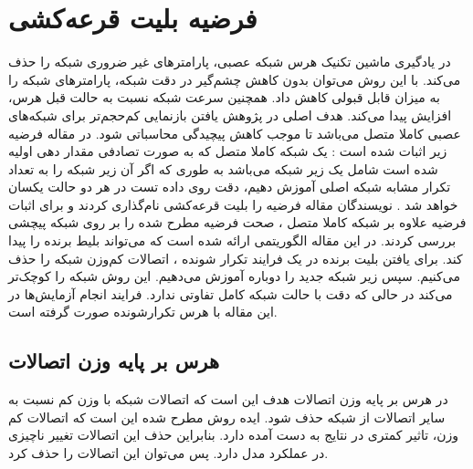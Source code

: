 \section{فرضیه بلیت قرعه‌کشی 
} 
در یادگیری ماشین تکنیک هرس 
شبکه عصبی، پارامتر‌های غیر ضروری شبکه را حذف می‌کند. با این روش می‌توان بدون کاهش چشم‌گیر در دقت شبکه، پارامتر‌های شبکه را به میزان قابل قبولی کاهش داد.  همچنین سرعت شبکه نسبت به حالت قبل هرس، افزایش پیدا می‌کند.
هدف اصلی در پژوهش یافتن بازنمایی کم‌حجم‌تر برای شبکه‌های عصبی کاملا متصل
می‌باشد تا موجب کاهش پیچیدگی محاسباتی شود. در مقاله فرضیه زیر اثبات شده است :
یک شبکه کاملا متصل که به صورت تصادفی مقدار دهی اولیه شده است
شامل یک زیر شبکه
می‌باشد به طوری که اگر آن زیر شبکه را به تعداد تکرار
مشابه شبکه اصلی آموزش دهیم، دقت روی داده تست در هر دو حالت یکسان خواهد شد \cite{frankle2019lottery}.
\newline \newline
نویسندگان مقاله فرضیه را بلیت قرعه‌کشی
نام‌گذاری کردند و برای اثبات فرضیه علاوه بر شبکه کاملا متصل
،
صحت فرضیه مطرح شده را بر روی شبکه پیچشی
بررسی کردند. در این مقاله الگوریتمی ارائه شده است که می‌تواند بلیط برنده 
را پیدا کند. برای یافتن بلیت برنده در یک فرایند تکرار شونده
، اتصالات کم‌وزن شبکه را حذف می‌کنیم. سپس زیر شبکه جدید را دوباره آموزش می‌دهیم. این روش شبکه را کوچک‌‌تر می‌کند در حالی که دقت با حالت شبکه کامل تفاوتی ندارد. فرایند انجام آزمایش‌ها در این مقاله با هرس تکرارشونده
صورت گرفته است.


\subsection{هرس بر پایه وزن اتصالات}
در هرس بر پایه وزن اتصالات
هدف این است که اتصالات شبکه با وزن کم نسبت به سایر اتصالات از شبکه حذف شود. ایده روش مطرح شده این است که اتصالات کم وزن، تاثیر کمتری در نتایج به دست آمده دارد. بنابراین حذف این اتصالات تغییر ناچیزی در عملکرد مدل دارد. پس می‌توان این اتصالات را حذف کرد.

